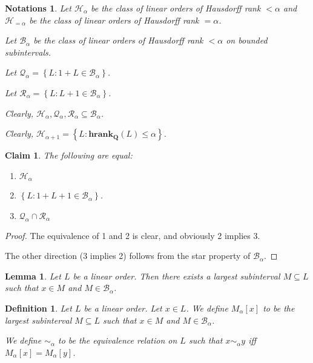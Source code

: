 \documentclass{article}
\newtheorem{lemma}{Lemma}
\newtheorem{claim}{Claim}
\newtheorem{definition}{Definition}
\newtheorem{notations}{Notations}
\newcommand{\braces}[1]{\left\{ {#1} \right\}}
\newcommand{\setcomp}[1]{\braces{#1}}
\newcommand{\hrank}[1]{\mathbf{hrank}_{\qq}\left( #1 \right)}
\newcommand{\qq}{\mathbf{Q}}
\begin{document}
\begin{notations}
  Let $\mathcal{H}_{\alpha}$ be the class of linear orders of Hausdorff rank
  $< \alpha$ and $\mathcal{H}_{=\alpha}$ be the class of linear orders of
  Hausdorff rank $= \alpha$.

  Let $\mathcal{B}_{\alpha}$ be the class of linear orders
  of Hausdorff rank $< \alpha$ on bounded subintervals.

  Let $\mathcal{Q}_{\alpha} = \setcomp{L : 1 + L \in \mathcal{B}_{\alpha}}$.

  Let $\mathcal{R}_{\alpha} = \setcomp{L : L + 1 \in \mathcal{B}_{\alpha}}$.

  Clearly,
  $\mathcal{H}_{\alpha}, \mathcal{Q}_{\alpha}, \mathcal{R}_{\alpha} \subseteq \mathcal{B}_{\alpha}$.

  Clearly,
  $\mathcal{H}_{\alpha + 1} = \setcomp{L : \hrank{L} \le \alpha}$.
\end{notations}

\begin{claim}
  The following are equal:

  \begin{enumerate}
    \item $\mathcal{H}_{\alpha}$
    \item $\setcomp{L : 1 + L + 1 \in \mathcal{B}_{\alpha}}$.
    \item $\mathcal{Q}_{\alpha} \cap \mathcal{R}_{\alpha}$
  \end{enumerate}

\end{claim}

\begin{proof}
  The equivalence of 1 and 2 is clear, and obviously
  2 implies 3.

  The other direction (3 implies 2) follows from the star property
  of $\mathcal{B}_{\alpha}$.
\end{proof}

\begin{lemma}
  Let $L$ be a linear order. Then there exists a largest subinterval $M \subseteq L$ such that
  $x \in M$ and $M \in \mathcal{B}_{\alpha}$.
\end{lemma}

\begin{definition}
  Let $L$ be a linear order. Let $x \in L$. We define $M_{\alpha}[x]$ to be the largest subinterval
  $M \subseteq L$ such that $x \in M$ and $M \in \mathcal{B}_{\alpha}$.

  We define $\sim_{\alpha}$ to be the equivalence relation on $L$ such that $x \sim_{\alpha} y$ iff
  $M_{\alpha}[x] = M_{\alpha}[y]$.
\end{definition}
\end{document}
